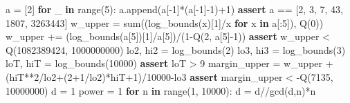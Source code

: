 \documentclass[
  11pt,
  a4paper,
]{article}
\newenvironment{Shaded}{}{}
\newcommand{\BuiltInTok}[1]{\textcolor[rgb]{0.00,0.50,0.00}{#1}}
\newcommand{\ControlFlowTok}[1]{\textcolor[rgb]{0.00,0.44,0.13}{\textbf{#1}}}
\newcommand{\DecValTok}[1]{\textcolor[rgb]{0.25,0.63,0.44}{#1}}
\newcommand{\KeywordTok}[1]{\textcolor[rgb]{0.00,0.44,0.13}{\textbf{#1}}}
\newcommand{\NormalTok}[1]{#1}
\newcommand{\OperatorTok}[1]{\textcolor[rgb]{0.40,0.40,0.40}{#1}}
\begin{document}
\begin{Shaded}
\begin{Highlighting}[]
\NormalTok{a }\OperatorTok{=}\NormalTok{ [}\DecValTok{2}\NormalTok{]}
\ControlFlowTok{for}\NormalTok{ \_ }\KeywordTok{in} \BuiltInTok{range}\NormalTok{(}\DecValTok{5}\NormalTok{):}
\NormalTok{    a.append(a[}\OperatorTok{{-}}\DecValTok{1}\NormalTok{]}\OperatorTok{*}\NormalTok{(a[}\OperatorTok{{-}}\DecValTok{1}\NormalTok{]}\OperatorTok{{-}}\DecValTok{1}\NormalTok{)}\OperatorTok{+}\DecValTok{1}\NormalTok{)}
\ControlFlowTok{assert}\NormalTok{ a }\OperatorTok{==}\NormalTok{ [}\DecValTok{2}\NormalTok{, }\DecValTok{3}\NormalTok{, }\DecValTok{7}\NormalTok{, }\DecValTok{43}\NormalTok{, }\DecValTok{1807}\NormalTok{, }\DecValTok{3263443}\NormalTok{]}
\NormalTok{w\_upper }\OperatorTok{=} \BuiltInTok{sum}\NormalTok{((log\_bounds(x)[}\DecValTok{1}\NormalTok{]}\OperatorTok{/}\NormalTok{x }\ControlFlowTok{for}\NormalTok{ x }\KeywordTok{in}\NormalTok{ a[:}\DecValTok{5}\NormalTok{]), Q(}\DecValTok{0}\NormalTok{))}
\NormalTok{w\_upper }\OperatorTok{+=}\NormalTok{ (log\_bounds(a[}\DecValTok{5}\NormalTok{])[}\DecValTok{1}\NormalTok{]}\OperatorTok{/}\NormalTok{a[}\DecValTok{5}\NormalTok{])}\OperatorTok{/}\NormalTok{(}\DecValTok{1}\OperatorTok{{-}}\NormalTok{Q(}\DecValTok{2}\NormalTok{, a[}\DecValTok{5}\NormalTok{]}\OperatorTok{{-}}\DecValTok{1}\NormalTok{))}
\ControlFlowTok{assert}\NormalTok{ w\_upper }\OperatorTok{\textless{}}\NormalTok{ Q(}\DecValTok{1082389424}\NormalTok{, }\DecValTok{1000000000}\NormalTok{)}
\NormalTok{lo2, hi2 }\OperatorTok{=}\NormalTok{ log\_bounds(}\DecValTok{2}\NormalTok{)}
\NormalTok{lo3, hi3 }\OperatorTok{=}\NormalTok{ log\_bounds(}\DecValTok{3}\NormalTok{)}
\NormalTok{loT, hiT }\OperatorTok{=}\NormalTok{ log\_bounds(}\DecValTok{10000}\NormalTok{)}
\ControlFlowTok{assert}\NormalTok{ loT }\OperatorTok{\textgreater{}} \DecValTok{9}
\NormalTok{margin\_upper }\OperatorTok{=}\NormalTok{ w\_upper }\OperatorTok{+}\NormalTok{ (hiT}\OperatorTok{**}\DecValTok{2}\OperatorTok{/}\NormalTok{lo2}\OperatorTok{+}\NormalTok{(}\DecValTok{2}\OperatorTok{+}\DecValTok{1}\OperatorTok{/}\NormalTok{lo2)}\OperatorTok{*}\NormalTok{hiT}\OperatorTok{+}\DecValTok{1}\NormalTok{)}\OperatorTok{/}\DecValTok{10000}\OperatorTok{{-}}\NormalTok{lo3}
\ControlFlowTok{assert}\NormalTok{ margin\_upper }\OperatorTok{\textless{}} \OperatorTok{{-}}\NormalTok{Q(}\DecValTok{7135}\NormalTok{, }\DecValTok{10000000}\NormalTok{)}
\NormalTok{d }\OperatorTok{=} \DecValTok{1}
\NormalTok{power }\OperatorTok{=} \DecValTok{1}
\ControlFlowTok{for}\NormalTok{ n }\KeywordTok{in} \BuiltInTok{range}\NormalTok{(}\DecValTok{1}\NormalTok{, }\DecValTok{10000}\NormalTok{):}
\NormalTok{    d }\OperatorTok{=}\NormalTok{ d}\OperatorTok{//}\NormalTok{gcd(d,n)}\OperatorTok{*}\NormalTok{n}

\end{Highlighting}
\end{Shaded}
\end{document}
